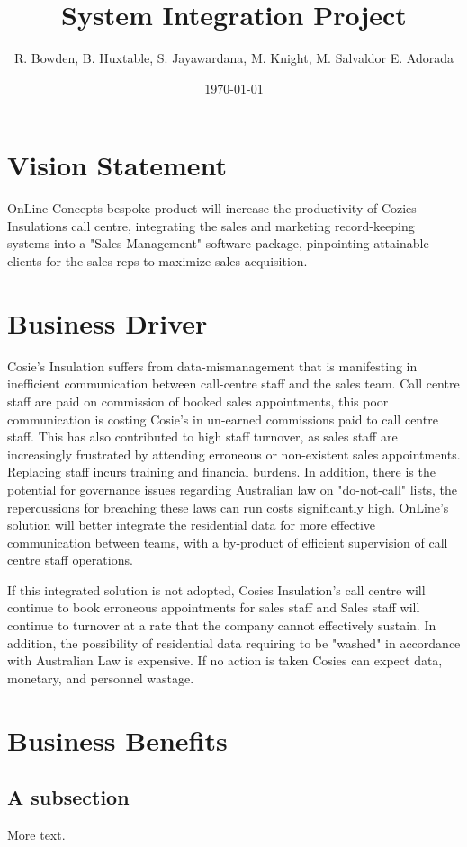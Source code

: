 \documentclass[11pt]{article} %
\title{System Integration Project}
\author{R. Bowden, B. Huxtable, S. Jayawardana, M. Knight, M. Salvaldor E. Adorada}
\date{\today}
\begin{document}
\maketitle
\newpage

\tableofcontents       
\newpage


\section{Vision Statement}
\begin{center}
OnLine Concepts bespoke product will increase the productivity of Cozies Insulations call centre, integrating the sales and marketing record-keeping systems into a "Sales Management"
software package, pinpointing attainable clients for the sales reps to maximize sales acquisition.
\end{center}

\section{Business Driver}
\begin{flushleft}
Cosie's Insulation suffers from data-mismanagement that is manifesting in inefficient communication between call-centre staff and the sales team. Call centre staff are paid on commission of booked sales appointments, this poor communication is costing Cosie's in un-earned commissions paid to call centre staff. This has also contributed to high staff turnover, as sales staff are increasingly frustrated by attending erroneous or non-existent sales appointments. Replacing staff incurs training and financial burdens. In addition, there is the potential for governance issues regarding Australian law on "do-not-call" lists, the repercussions for breaching these laws can run costs significantly high. OnLine's solution will better integrate the residential data for more effective communication between teams, with a by-product of efficient supervision of call centre staff operations.

If this integrated solution is not adopted, Cosies Insulation's call centre will continue to book erroneous appointments for sales staff and Sales staff will continue to turnover at a rate that the company cannot effectively sustain. In addition, the possibility of residential data requiring to be "washed" in accordance with Australian Law is expensive. If no action is taken Cosies can expect data, monetary, and personnel wastage.

\end{flushleft}

\section{Business Benefits}
\subsection{A subsection}

More text.
\end{document}
